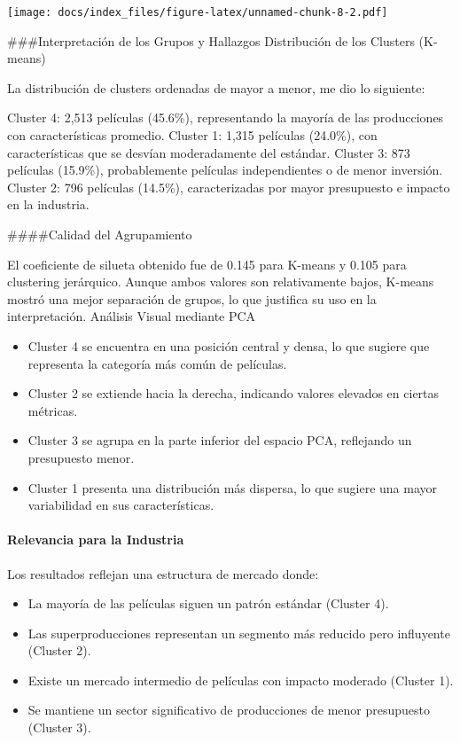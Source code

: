 \documentclass[
]{article}
\providecommand{\tightlist}{%
  \setlength{\itemsep}{0pt}\setlength{\parskip}{0pt}}
\begin{document}
\texttt{[image: docs/index\_files/figure-latex/unnamed-chunk-8-2.pdf]}

\#\#\#Interpretación de los Grupos y Hallazgos Distribución de los
Clusters (K-means)

La distribución de clusters ordenadas de mayor a menor, me dio lo
siguiente:

Cluster 4: 2,513 películas (45.6\%), representando la mayoría de las
producciones con características promedio. Cluster 1: 1,315 películas
(24.0\%), con características que se desvían moderadamente del estándar.
Cluster 3: 873 películas (15.9\%), probablemente películas
independientes o de menor inversión. Cluster 2: 796 películas (14.5\%),
caracterizadas por mayor presupuesto e impacto en la industria.

\#\#\#\#Calidad del Agrupamiento

El coeficiente de silueta obtenido fue de 0.145 para K-means y 0.105
para clustering jerárquico. Aunque ambos valores son relativamente
bajos, K-means mostró una mejor separación de grupos, lo que justifica
su uso en la interpretación. Análisis Visual mediante PCA

\begin{itemize}
\tightlist
\item
  Cluster 4 se encuentra en una posición central y densa, lo que sugiere
  que representa la categoría más común de películas.
\item
  Cluster 2 se extiende hacia la derecha, indicando valores elevados en
  ciertas métricas.
\item
  Cluster 3 se agrupa en la parte inferior del espacio PCA, reflejando
  un presupuesto menor.
\item
  Cluster 1 presenta una distribución más dispersa, lo que sugiere una
  mayor variabilidad en sus características.
\end{itemize}

\paragraph{Relevancia para la
Industria}\label{relevancia-para-la-industria}

Los resultados reflejan una estructura de mercado donde:

\begin{itemize}
\tightlist
\item
  La mayoría de las películas siguen un patrón estándar (Cluster 4).
\item
  Las superproducciones representan un segmento más reducido pero
  influyente (Cluster 2).
\item
  Existe un mercado intermedio de películas con impacto moderado
  (Cluster 1).
\item
  Se mantiene un sector significativo de producciones de menor
  presupuesto (Cluster 3).
\end{itemize}
\end{document}

